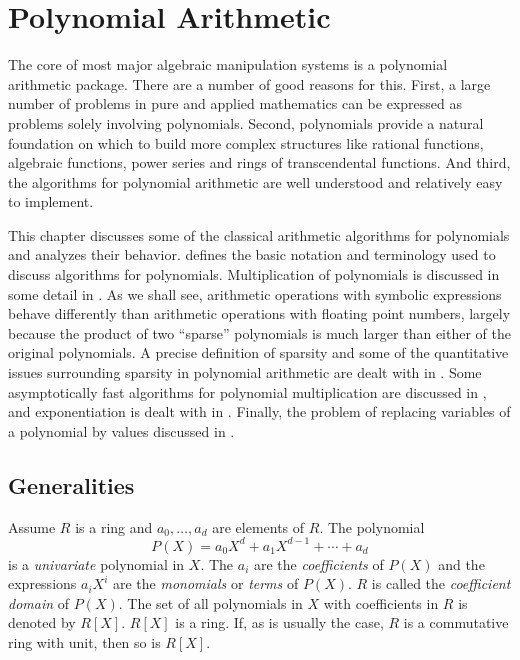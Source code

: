 \chapter{Polynomial Arithmetic}
\label{Poly:Arith:Chap}

The core of most major algebraic manipulation systems is a polynomial
arithmetic package.  There are a number of good reasons for this.
First, a large number of problems in pure and applied mathematics can
be expressed as problems solely involving polynomials.  Second,
polynomials provide a natural foundation on which to build more
complex structures like rational functions, algebraic functions, power
series and rings of transcendental functions.  And third, the
algorithms for polynomial arithmetic are well understood and
relatively easy to implement.

This chapter discusses some of the classical arithmetic algorithms for
polynomials and analyzes their behavior.
 defines the basic notation and 
terminology used to discuss algorithms for polynomials.
Multiplication of polynomials is discussed in some detail in
.  As we shall see, arithmetic operations with
symbolic expressions behave differently than arithmetic operations
with floating point numbers, largely because the product of two
``sparse'' polynomials is much larger than either of the original
polynomials.  A precise definition of sparsity and some of the
quantitative issues surrounding sparsity in polynomial arithmetic are
dealt with in .  Some asymptotically fast
algorithms for polynomial multiplication are discussed in
, and exponentiation is dealt with in
.  Finally, the problem of replacing variables
of a polynomial by values discussed in .

\section{Generalities}
\label{Poly:Generalities:Sec}

Assume $R$ is a ring and $a_{0}, \ldots, a_{d}$ are elements of $R$.
The polynomial
\[
P(X) = a_{0}X^{d}+ a_{1}X^{d-1} + \cdots + a_{d}
\]
is a {\em univariate} polynomial in $X$. The
$a_{i}$ are the {\em coefficients} of $P(X)$ and the expressions $a_{i}
X^{i}$ are the {\em monomials} or {\em terms} of $P(X)$. $R$ is called the {\em coefficient
domain} of $P(X)$. The set of
all polynomials in $X$ with coefficients in $R$ is denoted by $R[X]$.
$R[X]$ is a ring. If, as is usually the case, $R$ is a commutative
ring with unit, then so is $R[X]$.

